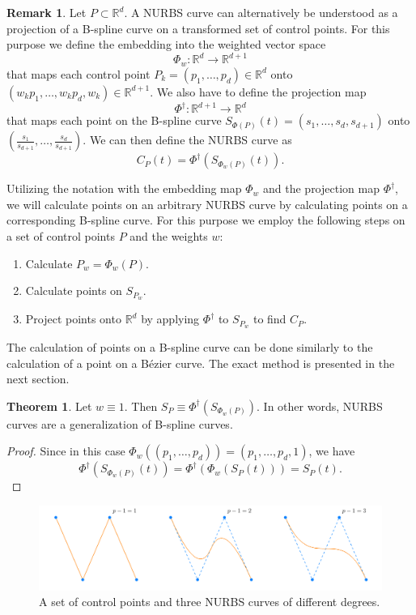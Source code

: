 \documentclass[a4paper, 11pt]{report}
\theoremstyle{definition}
\newtheorem{theorem}[definition]{Theorem}
\newtheorem*{remark}{Remark}
\begin{document}
	\begin{remark}
		Let $P \subset \mathbb{R}^d$. A NURBS curve can alternatively be understood as a projection of a B-spline curve on a transformed set of control points. For this purpose we define the embedding into the weighted vector space
			$$\Phi_w: \mathbb{R}^d \rightarrow \mathbb{R}^{d+1}$$
		that maps each control point $P_k = (p_1, \ldots, p_d) \in \mathbb{R}^d$ onto $(w_k p_1, \ldots, w_k p_d, w_k) \in \mathbb{R}^{d+1}$.
		We also have to define the projection map
			$$\Phi^\dagger: \mathbb{R}^{d+1} \rightarrow \mathbb{R}^d$$ 
		that maps each point on the B-spline curve $S_{\Phi(P)}(t) = (s_1, \ldots, s_d, s_{d+1})$ onto $(\frac{s_1}{s_{d+1}}, \ldots, \frac{s_d}{s_{d+1}})$.
		We can then define the NURBS curve as
				$$ C_P(t) = \Phi^\dagger(S_{\Phi_w(P)}(t)).$$ 
	\end{remark}

	Utilizing the notation with the embedding map $\Phi_w$ and the projection map $\Phi^\dagger$, we will calculate points on an arbitrary NURBS curve by calculating points on a corresponding B-spline curve. For this purpose we employ the following steps on a set of control points $P$ and the weights $w$:
	\begin{enumerate}
		\item Calculate $P_w = \Phi_w(P)$.
		\item Calculate points on $S_{P_w}$.
		\item Project points onto $\mathbb{R}^d$ by applying $\Phi^\dagger$ to $S_{P_w}$ to find $C_P$.
	\end{enumerate}
	The calculation of points on a B-spline curve can be done similarly to the calculation of a point on a Bézier curve. The exact method is presented in the next section.

	\begin{theorem}
		Let $w \equiv 1$. Then $S_P \equiv \Phi^\dagger(S_{\Phi_w(P)})$. In other words, NURBS curves are a generalization of B-spline curves.
	\end{theorem}
	\begin{proof}
		Since in this case $\Phi_w((p_1, \ldots, p_d)) = (p_1, \ldots, p_d, 1)$, we have
			$$\Phi^\dagger(S_{\Phi_w(P)}(t)) = \Phi^\dagger(\Phi_w(S_P(t))) = S_P(t).$$
	\end{proof}

	\begin{figure}[H]
		\centering
		\includegraphics[width=\textwidth]{../tec/nurbsCurve/nurbsCurve.png}
		\caption{A set of control points and three NURBS curves of different degrees.}
		\label{fig:nurbscurve}
	\end{figure}
\end{document}
